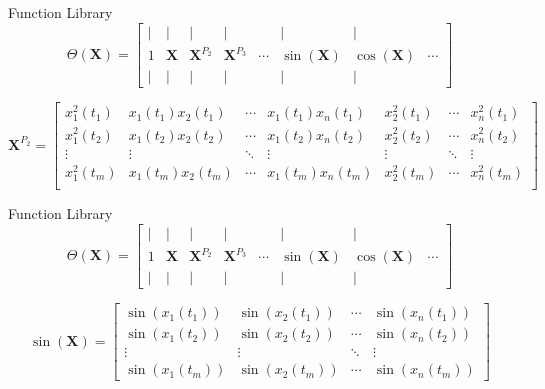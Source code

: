 \documentclass[aspectratio=169]{beamer}
\begin{document}
\begin{frame}{Function Library}
	\[  \Theta(\mathbf X) = \begin{bmatrix} \mid & \mid & \mid & \mid &  & \mid & \mid & \\ 1 & \mathbf X & {\mathbf X}^{P_2} & {\mathbf X}^{P_3} & \cdots & \sin{(\mathbf X)} & \cos{(\mathbf X)} & \cdots \\ \mid & \mid & \mid & \mid & & \mid & \mid & \end{bmatrix}  \]

	\vspace{1.5em}

	\[ \mathbf X^{P_2} = \begin{bmatrix}
		x_1^2(t_1) & x_1(t_1)x_2(t_1) & \cdots & x_1(t_1)x_n(t_1) & x_2^2(t_1) & \cdots & x_n^2(t_1) \\
		x_1^2(t_2) & x_1(t_2)x_2(t_2) & \cdots & x_1(t_2)x_n(t_2) & x_2^2(t_2) & \cdots & x_n^2(t_2) \\
		\vdots & \vdots & \ddots & \vdots & \vdots & \ddots & \vdots \\
		x_1^2(t_m) & x_1(t_m)x_2(t_m) & \cdots & x_1(t_m)x_n(t_m) & x_2^2(t_m) & \cdots & x_n^2(t_m) \\
	\end{bmatrix} \]

\end{frame}

\begin{frame}{Function Library}
	\[  \Theta(\mathbf X) = \begin{bmatrix} \mid & \mid & \mid & \mid &  & \mid & \mid & \\ 1 & \mathbf X & {\mathbf X}^{P_2} & {\mathbf X}^{P_3} & \cdots & \sin{(\mathbf X)} & \cos{(\mathbf X)} & \cdots \\ \mid & \mid & \mid & \mid & & \mid & \mid & \end{bmatrix}  \]

	\vspace{1.5em}

	\[ \sin{(\mathbf X)} = \begin{bmatrix}
		\sin(x_1(t_1)) & \sin(x_2(t_1)) & \cdots & \sin(x_n(t_1)) \\ 
		\sin(x_1(t_2)) & \sin(x_2(t_2)) & \cdots & \sin(x_n(t_2)) \\
		\vdots & \vdots & \ddots & \vdots \\ 
		\sin(x_1(t_m)) & \sin(x_2(t_m)) & \cdots & \sin(x_n(t_m))
	\end{bmatrix} \]
\end{frame}
\end{document}
